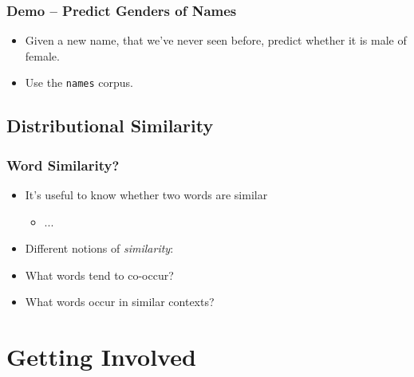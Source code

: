 \documentclass{beamer}             %
\begin{document}
\begin{frame}
  \frametitle{Demo -- Predict Genders of Names}
  \begin{itemize}
  \item Given a new name, that we've never seen before, predict
    whether it is male of female.
  \item Use the \texttt{names} corpus.
  \end{itemize}
\end{frame}

\subsection{Distributional Similarity}

\begin{frame}
  \frametitle{Word Similarity?}
  \begin{itemize}
  \item It's useful to know whether two words are similar
    \begin{itemize}
    \item ...
    \end{itemize}
  \item Different notions of \emph{similarity}:
    \item What words tend to co-occur?
    \item What words occur in similar contexts?
  \end{itemize}
\end{frame}


\section{Getting Involved}

\end{document}
